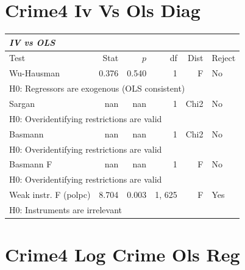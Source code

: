 \documentclass{article}
\begin{document}
\clearpage
\section*{Crime4 Iv Vs Ols Diag}

\renewcommand{\arraystretch}{1.1}
\setlength{\tabcolsep}{6pt}
\begin{table}[H]
\centering
\begin{tabular}{lrrrrl}
\hline
\multicolumn{6}{l}{\textit{IV vs OLS}} \\
\hline
Test & Stat & $p$ & df & Dist & Reject \\
\hline
Wu-Hausman & 0.376 & 0.540 & 1 & F & No \\
\multicolumn{6}{l}{\footnotesize{H0: Regressors are exogenous (OLS consistent)}} \\
Sargan & nan & nan & 1 & Chi2 & No \\
\multicolumn{6}{l}{\footnotesize{H0: Overidentifying restrictions are valid}} \\
Basmann & nan & nan & 1 & Chi2 & No \\
\multicolumn{6}{l}{\footnotesize{H0: Overidentifying restrictions are valid}} \\
Basmann F & nan & nan & 1 & F & No \\
\multicolumn{6}{l}{\footnotesize{H0: Overidentifying restrictions are valid}} \\
Weak instr. F (polpc) & 8.704 & 0.003 & 1, 625 & F & Yes \\
\multicolumn{6}{l}{\footnotesize{H0: Instruments are irrelevant}} \\
\hline
\end{tabular}
\end{table}

\clearpage
\section*{Crime4 Log Crime Ols Reg}
\end{document}
